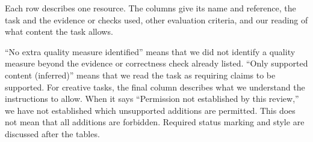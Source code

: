 Each row describes one resource. The columns give its name and reference,
the task and the evidence or checks used, other evaluation criteria, and
our reading of what content the task allows.

``No extra quality measure identified'' means that we did not identify a
quality measure beyond the evidence or correctness check already listed.
``Only supported content (inferred)'' means that we read the task as requiring
claims to be supported. For creative tasks, the final column describes what
we understand the instructions to allow. When it says ``Permission not
established by this review,'' we have not established which unsupported
additions are permitted. This does not mean that all additions are forbidden.
Required status marking and style are discussed after the tables.

\begingroup
\small
\setlength{\tabcolsep}{3pt}
\renewcommand{\arraystretch}{1.0}
